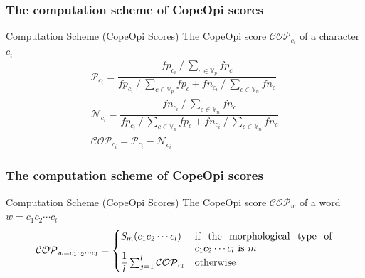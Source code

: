 \documentclass[mathserif]{beamer}
\DeclareMathOperator*{\divby}{/}
\begin{document}
\begin{frame}
\frametitle{The computation scheme of CopeOpi scores}
\begin{block}{Computation Scheme (CopeOpi Scores)}
The CopeOpi score $\mathcal{COP}_{c_i}$ of a character $c_i$
\begin{equation*}
\begin{gathered}
\mathcal{P}_{c_i} = \dfrac {
	fp_{c_i} \divby \sum_{c \in \mathbb{V}_p} fp_c
}{
	fp_{c_i} \divby \sum_{c \in \mathbb{V}_p} fp_c +
	fn_{c_i} \divby \sum_{c \in \mathbb{V}_n} fn_c
}
\\
\mathcal{N}_{c_i} = \dfrac {
	fn_{c_i} \divby \sum_{c \in \mathbb{V}_n} fn_c
}{
	fp_{c_i} \divby \sum_{c \in \mathbb{V}_p} fp_c +
	fn_{c_i} \divby \sum_{c \in \mathbb{V}_n} fn_c
}
\\
\mathcal{COP}_{c_i} = \mathcal{P}_{c_i} - \mathcal{N}_{c_i}
\end{gathered}
\end{equation*}
\end{block}
\begin{flushright}
\vspace{-9.5ex}
\end{flushright}
\end{frame}

\begin{frame}
\frametitle{The computation scheme of CopeOpi scores}
\begin{block}{Computation Scheme (CopeOpi Scores)\cite{Ku2009morph}}
The CopeOpi score $\mathcal{COP}_{w}$ of a word $w=c_1c_2 \cdots c_l$
\begin{equation*}
\mathcal{COP}_{w=c_1c_2 \cdots c_l} =
\begin{cases}
	\mathit{S}_m(c_1c_2 \cdots c_l)
	&\parbox[t]{.4\textwidth}{if the morphological type of $c_1c_2 \cdots c_l$ is $m$}\\
	\dfrac{1}{l} \sum_{j=1}^l \mathcal{COP}_{c_l}
	&\text{otherwise}
\end{cases}
\end{equation*}
\end{block}
\end{frame}
\end{document}
